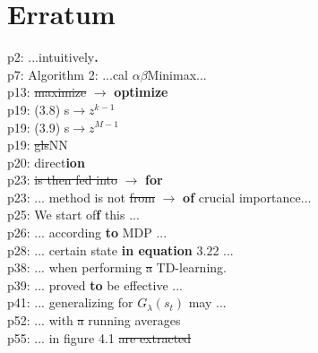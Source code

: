 \documentclass{article}
\begin{document}
 
\section*{Erratum}
p2: ...intuitively\textbf{.}\\
p7: Algorithm 2: ...cal $\alpha\beta$Minimax... \\
p13: \sout{maximize} $\rightarrow$ \textbf{optimize} \\
p19: (3.8) s$\rightarrow z^{k-1}$ \\
p19: (3.9) s$\rightarrow z^{M-1}$ \\
p19: \sout{gls}NN \\
p20: direct\textbf{ion} \\
p23: \sout{is then fed into} $\rightarrow$ \textbf{for} \\
p23: ... method is not \sout{from} $\rightarrow$ \textbf{of} crucial importance... \\
p25: We start of\textbf{f} this ... \\
p26: ... according \textbf{to} MDP ... \\
p28: ... certain state \textbf{in equation} 3.22 ...\\
p38: ... when performing \sout{a} TD-learning. \\
p39: ... proved \textbf{to} be effective ... \\
p41: ... generalizing for $G_\lambda(s_t)$ may ... \\
p52: ... with \sout{a} running averages \\
p55: ... in figure 4.1 \sout{are extracted} \\


 
\end{document}
